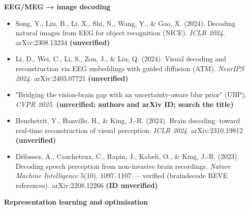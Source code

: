\documentclass[
  11pt,
]{article}
\providecommand{\tightlist}{%
  \setlength{\itemsep}{0pt}\setlength{\parskip}{0pt}}
\renewcommand{\_}{\oldunderscore\allowbreak}
\begin{document}
\textbf{EEG/MEG → image decoding}

\begin{itemize}
\tightlist
\item
  Song, Y., Liu, B., Li, X., Shi, N.,
  Wang, Y., \& Gao, X. (2024). Decoding
  natural images from EEG for object
  recognition (NICE). \emph{ICLR 2024}.
  arXiv:2308.13234 \textbf{(unverified)}
\item
  Li, D., Wei, C., Li, S., Zou, J., \&
  Liu, Q. (2024). Visual decoding and
  reconstruction via EEG embeddings with
  guided diffusion (ATM). \emph{NeurIPS
  2024}. arXiv:2403.07721
  \textbf{(unverified)}
\item
  "Bridging the vision-brain gap with an
  uncertainty-aware blur prior" (UBP).
  \emph{CVPR 2025}. \textbf{(unverified:
  authors and arXiv ID; search the
  title)}
\item
  Benchetrit, Y., Banville, H., \& King,
  J.-R. (2024). Brain decoding: toward
  real-time reconstruction of visual
  perception. \emph{ICLR 2024}.
  arXiv:2310.19812 \textbf{(unverified)}
\item
  Défossez, A., Caucheteux, C., Rapin,
  J., Kabeli, O., \& King, J.-R. (2023).
  Decoding speech perception from
  non-invasive brain recordings.
  \emph{Nature Machine Intelligence}
  5(10), 1097--1107 --- verified
  (braindecode REVE references).
  arXiv:2208.12266 \textbf{(ID
  unverified)}
\end{itemize}

\textbf{Representation learning and
optimisation}
\end{document}
